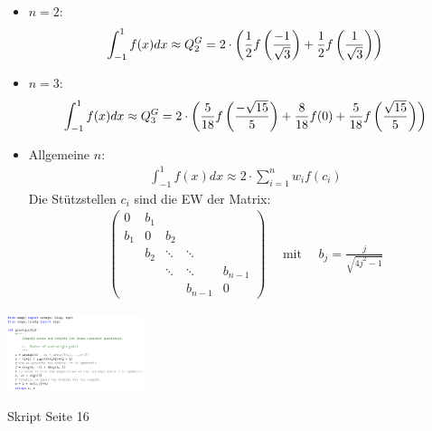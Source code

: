  {

    \begin{itemize}
        \item $n=2$:
            \begin{align*}
                \int_{-1}^1 f(x) dx \approx Q_2^G =
            2 \cdot \left( \frac{1}{2} f \left( \frac{-1}{\sqrt{3}} \right) + \frac{1}{2} f \left( \frac{1}{\sqrt{3}} \right) \right)
            \end{align*}
        \item $n=3$:
            \begin{align*}
                \int_{-1}^1 f(x) dx \approx Q_3^G =
            2 \cdot \left( \frac{5}{18} f \left( \frac{- \sqrt{15}}{5} \right) + \frac{8}{18} f(0) + \frac{5}{18} f \left( \frac{\sqrt{15}}{5} \right) \right)
            \end{align*}
        \item Allgemeine $n$:
            \begin{align*}
                \int_{-1}^1 f(x) dx \approx 2 \cdot \sum_{i=1}^n w_i f(c_i)
            \end{align*}
            Die Stützstellen $c_i$ sind die EW der Matrix:
            \begin{align*}
                \begin{pmatrix}
                    0 & b_1 & & & \\
                    b_1 & 0 & b_2 & & \\
                    & b_2 & \ddots & \ddots & \\
                    & & \ddots & \ddots & b_{n-1} \\
                    & & & b_{n-1} & 0
                \end{pmatrix}
                \quad \text{ mit } \quad
                b_j = \frac{j}{\sqrt{4 j^2 -1}}                
            \end{align*}
    \end{itemize}
    
    \begin{center}
        \includegraphics[width=0.3\textwidth]{Figures/Gauss_Legegendre.png}

        Skript Seite 16
    \end{center}    
}

